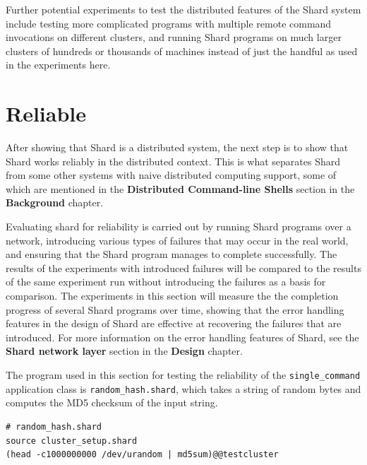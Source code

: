 \documentclass[twoside]{report}
\begin{document}
Further potential experiments to test the distributed features of the Shard system include testing more complicated programs with multiple remote command invocations on different clusters, and running Shard programs on much larger clusters of hundreds or thousands of machines instead of just the handful as used in the experiments here.

\section{Reliable}


After showing that Shard is a distributed system, the next step is to show that Shard works reliably in the distributed context.
This is what separates Shard from some other systems with naive distributed computing support, some of which are mentioned in the \textbf{Distributed Command-line Shells} section in the \textbf{Background} chapter.

Evaluating shard for reliability is carried out by running Shard programs over a network, introducing various types of failures that may occur in the real world, and ensuring that the Shard program manages to complete successfully.
The results of the experiments with introduced failures will be compared to the results of the same experiment run without introducing the failures as a basis for comparison.
The experiments in this section will measure the the completion progress of several Shard programs over time, showing that the error handling features in the design of Shard are effective at recovering the failures that are introduced.
For more information on the error handling features of Shard, see the \textbf{Shard network layer} section in the \textbf{Design} chapter.

The program used in this section for testing the reliability of the \texttt{single\_command} application class is \texttt{random\_hash.shard}, which takes a string of random bytes and computes the MD5 checksum of the input string.
\begin{lstlisting}[language=Shard]
# random_hash.shard
source cluster_setup.shard
(head -c1000000000 /dev/urandom | md5sum)@@testcluster
\end{lstlisting}
\end{document}
